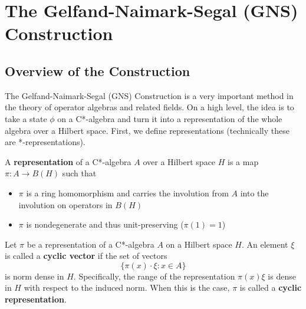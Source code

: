 \section{The Gelfand-Naimark-Segal (GNS) Construction}
\subsection{Overview of the Construction}
The Gelfand-Naimark-Segal (GNS) Construction is a very important method in the
theory of operator algebras and related fields. On a high level, the idea is to 
take a state $\phi$ on a C*-algebra and turn it into a representation of the whole
algebra over a Hilbert space. First, we define representations (technically these
are *-representations).
\begin{definition}
    A \textbf{representation} of a C*-algebra $A$ over a Hilbert space $H$ is a map
    $\pi: A \to B(H)$ such that
    \begin{itemize}
        \item $\pi$ is a ring homomorphism and carries the involution from $A$
        into the involution on operators in $B(H)$
        \item $\pi$ is nondegenerate and thus unit-preserving ($\pi(1) = 1$)
    \end{itemize}
\end{definition}

\begin{definition}
    Let $\pi$ be a representation of a C*-algebra $A$ on a Hilbert space $H$. An
    element $\xi$ is called a \textbf{cyclic vector} if the set of vectors
    \begin{equation*}
        \{ \pi(x) \cdot \xi : x \in A \}
    \end{equation*}
    is norm dense in $H$. Specifically, the range of the representation $\pi(x) \xi$
    is dense in $H$ with respect to the induced norm. When this is the case, $\pi$ is called a \textbf{cyclic representation}.
\end{definition}


